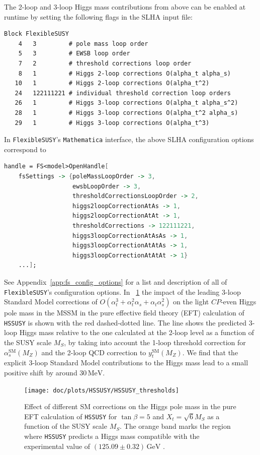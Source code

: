 \documentclass[final,3p,11pt,pdflatex]{elsarticle}
\makeatletter
\newcommand{\modelname}[1]{\texttt{#1}\@\xspace}
\newcommand{\fs}{\texttt{FlexibleSUSY}\@\xspace}
\newcommand{\HSSUSY}{\modelname{HSSUSY}}
\newcommand{\mathematica}{\texttt{Ma\-the\-ma\-ti\-ca}\xspace}
\newcommand{\unit}[1]{\,\text{#1}}      %
\newcommand{\SM}{\ensuremath{\text{SM}}\xspace}
\newcommand{\MS}{\ensuremath{M_S}\xspace}
\newcommand{\figref}[1]{\figurename~\ref{#1}}
\newcommand{\appref}[1]{Appendix~\ref{#1}}
\newcommand{\CP}{\ensuremath{CP}\xspace}
\def\at{\alpha_t}
\def\as{\alpha_s}
\makeatother
\begin{document}
The 2-loop and 3-loop Higgs mass contributions from above can be
enabled at runtime by setting the following flags in the SLHA input
file:
%
\begin{lstlisting}
Block FlexibleSUSY
    4   3         # pole mass loop order
    5   3         # EWSB loop order
    7   2         # threshold corrections loop order
    8   1         # Higgs 2-loop corrections O(alpha_t alpha_s)
   10   1         # Higgs 2-loop corrections O(alpha_t^2)
   24   122111221 # individual threshold correction loop orders
   26   1         # Higgs 3-loop corrections O(alpha_t alpha_s^2)
   28   1         # Higgs 3-loop corrections O(alpha_t^2 alpha_s)
   29   1         # Higgs 3-loop corrections O(alpha_t^3)
\end{lstlisting}
%
In \fs's \mathematica interface, the above SLHA configuration options
correspond to
%
\begin{lstlisting}[language=Mathematica]
handle = FS<model>OpenHandle[
    fsSettings -> {poleMassLoopOrder -> 3,
                   ewsbLoopOrder -> 3,
                   thresholdCorrectionsLoopOrder -> 2,
                   higgs2loopCorrectionAtAs -> 1,
                   higgs2loopCorrectionAtAt -> 1,
                   thresholdCorrections -> 122111221,
                   higgs3loopCorrectionAtAsAs -> 1,
                   higgs3loopCorrectionAtAtAs -> 1,
                   higgs3loopCorrectionAtAtAt -> 1}
    ...];
\end{lstlisting}
%
See \appref{app:fs_config_options} for a list and description of
all of \fs's configuration options.
%
In \figref{fig:SM_thresholds} the impact of the leading 3-loop
Standard Model corrections of $O(\at^3 + \at^2 \as + \at \as^2)$ on
the light \CP-even Higgs pole mass in the MSSM in the pure effective
field theory (EFT) calculation of \HSSUSY is shown with the red
dashed-dotted line.  The line shows the predicted 3-loop Higgs mass
relative to the one calculated at the 2-loop level as a function of
the SUSY scale \MS, by taking into account the 1-loop threshold
correction for $\as^{\SM}(M_Z)$ and the 2-loop QCD correction to
$y_t^{\SM}(M_Z)$.  We find that the explicit 3-loop Standard Model
contributions to the Higgs mass lead to a small positive shift by
around $30\unit{MeV}$.
%
\begin{figure}[tbh]
  \centering
  \texttt{[image: doc/plots/HSSUSY/HSSUSY\_thresholds]}
  \caption{Effect of different SM corrections on the Higgs
    pole mass in the pure EFT calculation of \HSSUSY for
    $\tan\beta = 5$ and $X_t = \sqrt{6}\MS$ as a function of the SUSY
    scale \MS.  The orange band marks the region where \HSSUSY
    predicts a Higgs mass compatible with the experimental value of
    $(125.09 \pm 0.32)\unit{GeV}$ \cite{Aad:2015zhl}.}
  \label{fig:SM_thresholds}
\end{figure}
\end{document}
